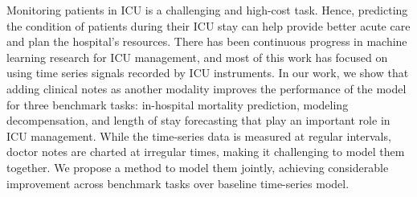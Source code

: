 Monitoring patients in ICU is a challenging and high-cost task. Hence, predicting the condition of patients during their ICU stay can help provide better acute care and plan the hospital's resources. There has been continuous progress in machine learning research for ICU management, and most of this work has focused on using time series signals recorded by ICU instruments. In our work, we show that adding clinical notes as another modality improves the performance of the model for three benchmark tasks: in-hospital mortality prediction, modeling decompensation, and length of stay forecasting that play an important role in ICU management. While the time-series data is measured at regular intervals, doctor notes are charted at irregular times, making it challenging to model them together. We propose a method to model them jointly, achieving considerable improvement across benchmark tasks over baseline time-series model.